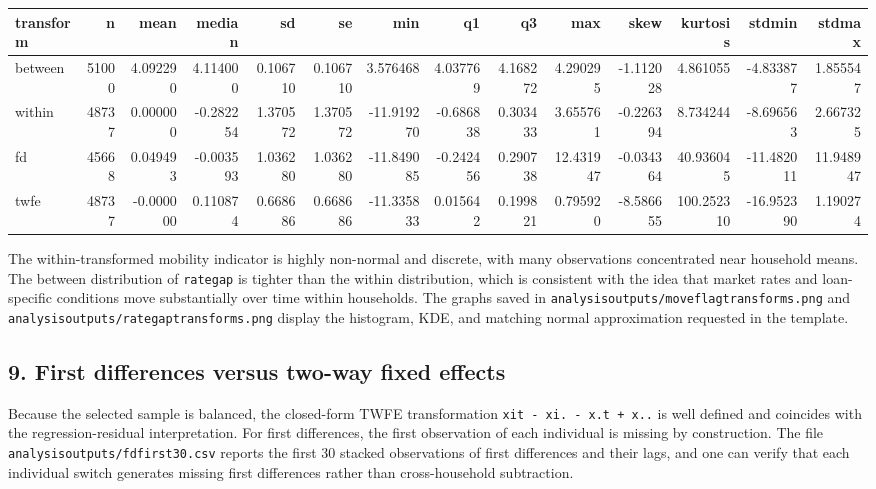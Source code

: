 \documentclass[a4paper,11pt]{article}
\renewcommand{\_}{\textunderscore\allowbreak}
\renewcommand{\arraystretch}{1.25}
\begin{document}
\begin{center}
\begingroup
\scriptsize
\setlength{\tabcolsep}{3pt}
\renewcommand{\arraystretch}{1.22}
\begin{adjustbox}{max width=\textwidth}
\begin{tabular}{@{}lrrrrrrrrrrrrr@{}}
\toprule
transform & n & mean & median & sd & se & min & q1 & q3 & max & skew &
kurtosis & std\_min & std\_max \\
\midrule
between & 51000 & 4.092290 & 4.114000 & 0.106710 & 0.106710 & 3.576468 &
4.037769 & 4.168272 & 4.290295 & -1.112028 & 4.861055 & -4.833877 &
1.855547 \\
within & 48737 & 0.000000 & -0.282254 & 1.370572 & 1.370572 & -11.919270
& -0.686838 & 0.303433 & 3.655761 & -0.226394 & 8.734244 & -8.696563 &
2.667325 \\
fd & 45668 & 0.049493 & -0.003593 & 1.036280 & 1.036280 & -11.849085 &
-0.242456 & 0.290738 & 12.431947 & -0.034364 & 40.936045 & -11.482011 &
11.948947 \\
twfe & 48737 & -0.000000 & 0.110874 & 0.668686 & 0.668686 & -11.335833 &
0.015642 & 0.199821 & 0.795920 & -8.586655 & 100.252310 & -16.952390 &
1.190274 \\
\bottomrule
\end{tabular}
\end{adjustbox}
\endgroup
\end{center}


The within-transformed mobility indicator is highly non-normal and
discrete, with many observations concentrated near household means. The
between distribution of \texttt{rate\_gap} is tighter than the within
distribution, which is consistent with the idea that market rates and
loan-specific conditions move substantially over time within households.
The graphs saved in
\texttt{analysis\_outputs/move\_flag\_transforms.png} and
\texttt{analysis\_outputs/rate\_gap\_transforms.png} display the
histogram, KDE, and matching normal approximation requested in the
template.

\hypertarget{first-differences-versus-two-way-fixed-effects}{%
\subsection{9. First differences versus two-way fixed
effects}\label{first-differences-versus-two-way-fixed-effects}}

Because the selected sample is balanced, the closed-form TWFE
transformation \texttt{x\_it\ -\ x\_i.\ -\ x\_.t\ +\ x\_..} is well
defined and coincides with the regression-residual interpretation. For
first differences, the first observation of each individual is missing
by construction. The file \texttt{analysis\_outputs/fd\_first30.csv}
reports the first 30 stacked observations of first differences and their
lags, and one can verify that each individual switch generates missing
first differences rather than cross-household subtraction.
\end{document}
